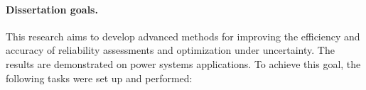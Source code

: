 
\paragraph{Dissertation goals.}


This research aims to develop advanced methods for improving the efficiency and accuracy of reliability assessments and optimization under uncertainty. The results are demonstrated on power systems applications.
To achieve this goal, the following tasks were set up and performed:

